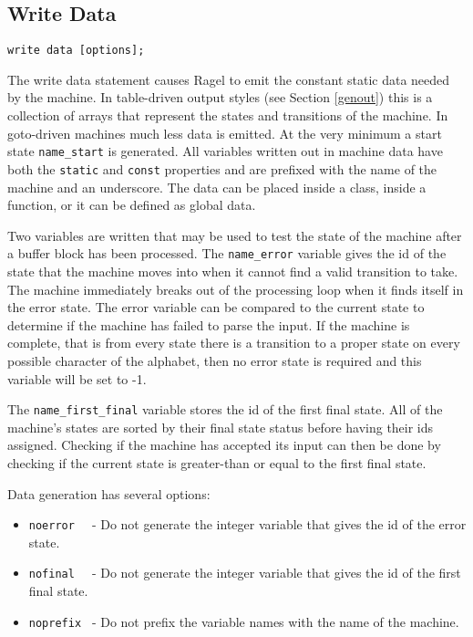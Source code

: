 \documentclass[letterpaper,11pt,oneside]{book}
\newcommand{\verbspace}{\vspace{10pt}}
\begin{document}
\subsection{Write Data}
\begin{verbatim}
write data [options];
\end{verbatim}
\verbspace

The write data statement causes Ragel to emit the constant static data needed
by the machine. In table-driven output styles (see Section \ref{genout}) this
is a collection of arrays that represent the states and transitions of the
machine.  In goto-driven machines much less data is emitted. At the very
minimum a start state \verb|name_start| is generated.  All variables written
out in machine data have both the \verb|static| and \verb|const| properties and
are prefixed with the name of the machine and an
underscore. The data can be placed inside a class, inside a function, or it can
be defined as global data.

Two variables are written that may be used to test the state of the machine
after a buffer block has been processed. The \verb|name_error| variable gives
the id of the state that the machine moves into when it cannot find a valid
transition to take. The machine immediately breaks out of the processing loop when
it finds itself in the error state. The error variable can be compared to the
current state to determine if the machine has failed to parse the input. If the
machine is complete, that is from every state there is a transition to a proper
state on every possible character of the alphabet, then no error state is required
and this variable will be set to -1.

The \verb|name_first_final| variable stores the id of the first final state. All of the
machine's states are sorted by their final state status before having their ids
assigned. Checking if the machine has accepted its input can then be done by
checking if the current state is greater-than or equal to the first final
state.

Data generation has several options:

\begin{itemize}
\setlength{\itemsep}{-2mm}
\item \verb|noerror  | - Do not generate the integer variable that gives the
id of the error state.
\item \verb|nofinal  | - Do not generate the integer variable that gives the
id of the first final state.
\item \verb|noprefix | - Do not prefix the variable names with the name of the
machine.
\end{itemize}
\end{document}
